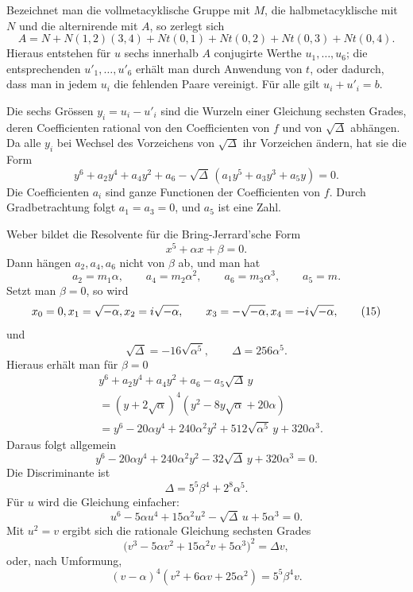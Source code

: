 \documentclass[11pt]{article}
\begin{document}
Bezeichnet man die vollmetacyklische Gruppe mit $M$, die halbmetacyklische mit $N$ und die alternirende mit $A$, so zerlegt sich
\[
 A=N+N(1,2)(3,4)+Nt(0,1)+Nt(0,2)+Nt(0,3)+Nt(0,4).                \tag{10}
\]
Hieraus entstehen für $u$ sechs innerhalb $A$ conjugirte Werthe $u_1,\ldots,u_6$; die entsprechenden $u'_1,\ldots,u'_6$ erhält man durch Anwendung von $t$, oder dadurch, dass man in jedem $u_i$ die fehlenden Paare vereinigt. Für alle gilt $u_i+u'_i=b$.

Die sechs Grössen $y_i=u_i-u'_i$ sind die Wurzeln einer Gleichung sechsten Grades, deren Coefficienten rational von den Coefficienten von $f$ und von $\sqrt\Delta$ abhängen. Da alle $y_i$ bei Wechsel des Vorzeichens von $\sqrt\Delta$ ihr Vorzeichen ändern, hat sie die Form
\[
 y^6+a_2y^4+a_4y^2+a_6-
 \sqrt\Delta\,(a_1y^5+a_3y^3+a_5y)=0.                            \tag{12}
\]
Die Coefficienten $a_i$ sind ganze Functionen der Coefficienten von $f$. Durch Gradbetrachtung folgt $a_1=a_3=0$, und $a_5$ ist eine Zahl.

Weber bildet die Resolvente für die Bring-Jerrard'sche Form
\[
  x^5+\alpha x+\beta=0.                                          \tag{13}
\]
Dann hängen $a_2,a_4,a_6$ nicht von $\beta$ ab, und man hat
\[
  a_2=m_1\alpha,
  \qquad a_4=m_2\alpha^2,
  \qquad a_6=m_3\alpha^3,
  \qquad a_5=m.                                                   \tag{14}
\]
Setzt man $\beta=0$, so wird
\[
 x_0=0,\\ x_1=\sqrt{-\alpha},\\ x_2=i\sqrt{-\alpha},
 \qquad x_3=-\sqrt{-\alpha},\\ x_4=-i\sqrt{-\alpha},              \tag{15}
\]
und
\[
  \sqrt\Delta=-16\sqrt{\alpha^5},
  \qquad \Delta=256\alpha^5.                                     \tag{16}
\]
Hieraus erhält man für $\beta=0$
\[
\begin{aligned}
&y^6+a_2y^4+a_4y^2+a_6-a_5\sqrt\Delta\,y\\
&=(y+2\sqrt\alpha)^4(y^2-8y\sqrt\alpha+20\alpha)\\
&=y^6-20\alpha y^4+240\alpha^2 y^2
  +512\sqrt{\alpha^5}\,y+320\alpha^3 .
\end{aligned}                                                     \tag{17}
\]
Daraus folgt allgemein
\[
  y^6-20\alpha y^4+240\alpha^2y^2
  -32\sqrt\Delta\,y+320\alpha^3=0.                              \tag{18}
\]
Die Discriminante ist
\[
  \Delta=5^5\beta^4+2^8\alpha^5.                                \tag{19}
\]
Für $u$ wird die Gleichung einfacher:
\[
  u^6-5\alpha u^4+15\alpha^2u^2-
  \sqrt\Delta\,u+5\alpha^3=0.                                    \tag{20}
\]
Mit $u^2=v$ ergibt sich die rationale Gleichung sechsten Grades
\[
  \bigl(v^3-5\alpha v^2+15\alpha^2v+5\alpha^3\bigr)^2
  =\Delta v,                                                     \tag{21}
\]
oder, nach Umformung,
\[
  (v-
\alpha)^4(v^2+6\alpha v+25\alpha^2)=5^5\beta^4 v.           \tag{22}
\]
\end{document}
